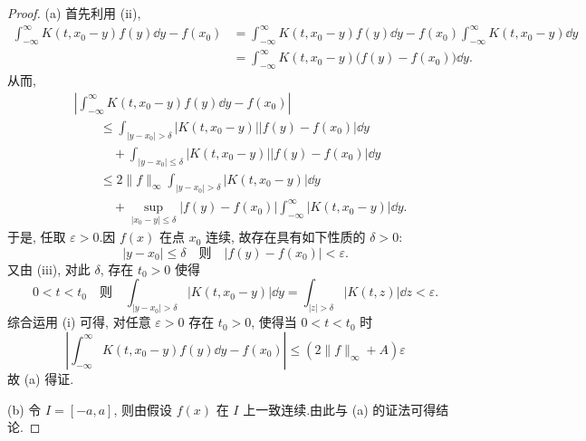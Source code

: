 \begin{proof}
(a) 首先利用 (ii), 
\begin{align*}
\int_{-\infty}^{\infty} K(t, x_{0} - y)f(y)\dd y - f(x_{0})
& = \int_{-\infty}^{\infty} K(t, x_{0} - y)f(y)\dd y - f(x_{0})\int_{-\infty}^{\infty} K(t, x_{0} - y)\dd y \\
& = \int_{-\infty}^{\infty} K(t, x_{0} - y)\bigl(f(y) - f(x_{0})\bigr)\dd y.
\end{align*}
从而, 
\begin{align*}
& \left| \int_{-\infty}^{\infty} K(t, x_{0} - y)f(y)\dd y - f(x_{0}) \right| \\
& \qquad \leq \int_{|y - x_{0}| > \delta} |K(t, x_{0} - y)||f(y) - f(x_{0})|\dd y \\
& \qquad\quad + \int_{|y - x_{0}| \leq \delta} |K(t, x_{0} - y)||f(y) - f(x_{0})|\dd y \\
& \qquad \leq 2\| f \|_{\infty} \int_{|y - x_{0}| > \delta} |K(t, x_{0} - y)|\dd y \\
& \qquad\quad + \sup_{|x_{0} - y| \leq \delta} |f(y) - f(x_{0})| \int_{-\infty}^{\infty} |K(t, x_{0} - y)|\dd y.
\end{align*}
于是, 任取 $\varepsilon > 0$.因 $f(x)$ 在点 $x_0$ 连续, 故存在具有如下性质的 $\delta > 0$:
\begin{equation*}
|y - x_{0}| \leq \delta \quad \text{则} \quad |f(y) - f(x_{0})| < \varepsilon.
\end{equation*}
又由 (iii), 对此 $\delta$, 存在 $t_{0} > 0$ 使得
\begin{equation*}
0 < t < t_{0} \quad \text{则} \quad \int_{|y - x_{0}| > \delta} |K(t, x_{0} - y)|\dd y = \int_{|z| > \delta} |K(t, z)|\dd z < \varepsilon.
\end{equation*}
综合运用 (i) 可得, 对任意 $\varepsilon > 0$ 存在 $t_0 > 0$, 使得当 $0 < t < t_0$ 时
\begin{equation*}
\left| \int_{-\infty}^{\infty} K(t, x_{0} - y)f(y)\dd y - f(x_{0}) \right| \leq (2\| f \|_{\infty} + A)\varepsilon
\end{equation*}
故 (a) 得证.

(b) 令 $I = [-a, a]$, 则由假设 $f(x)$ 在 $I$ 上一致连续.由此与 (a) 的证法可得结论.


\end{proof}
